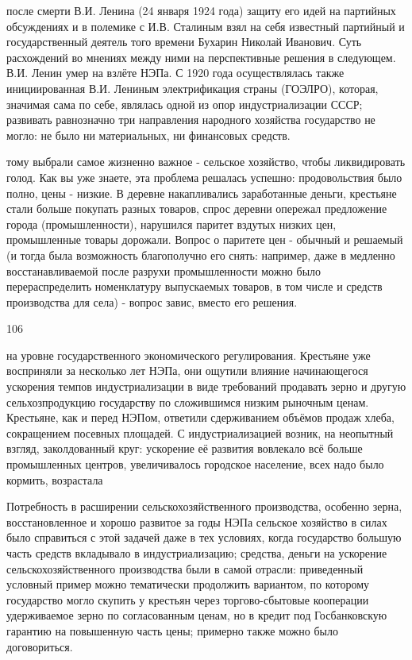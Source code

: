 \label{104-1}
после смерти
В.И. Ленина (24 января 1924 года) защиту его идей на партийных обсуждениях и в полемике с И.В. Сталиным взял на себя известный партийный и государственный деятель того времени Бухарин Николай Иванович. Суть расхождений во мнениях между ними на перспективные решения в следующем. В.И. Ленин умер на взлёте НЭПа. С 1920 года осуществлялась также инициированная В.И. Лениным электрификация страны (ГОЭЛРО), которая, значимая сама по себе, являлась одной из опор индустриализации СССР; развивать равнозначно три направления народного хозяйства государство не могло: не было ни материальных, ни финансовых средств.

\label{105-1}
тому выбрали самое жизненно важное - сельское хозяйство, чтобы ликвидировать голод. Как вы уже знаете, эта проблема решалась успешно: продовольствия было полно, цены - низкие. В деревне накапливались заработанные деньги, крестьяне стали больше покупать разных товаров, спрос деревни опережал предложение города (промышленности), нарушился паритет вздутых низких цен, промышленные товары дорожали. Вопрос о паритете цен - обычный и решаемый (и тогда была возможность благополучно его снять: например, даже в медленно восстанавливаемой после разрухи промышленности можно было перераспределить номенклатуру выпускаемых товаров, в том числе и средств производства для села) - вопрос завис, вместо его решения.

\label{106-1}
106

на уровне государственного экономического регулирования. Крестьяне уже восприняли за несколько лет НЭПа, они ощутили влияние начинающегося ускорения темпов индустриализации в виде требований продавать зерно и другую сельхозпродукцию государству по сложившимся низким рыночным ценам. Крестьяне, как и перед НЭПом, ответили сдерживанием объёмов продаж хлеба, сокращением посевных площадей. С индустриализацией возник, на неопытный взгляд, заколдованный круг: ускорение её развития вовлекало всё больше промышленных центров, увеличивалось городское население, всех надо было кормить, возрастала

\label{107-1}
Потребность в расширении сельскохозяйственного производства, особенно зерна, восстановленное и хорошо развитое за годы НЭПа сельское хозяйство в силах было справиться с этой задачей даже в тех условиях, когда государство большую часть средств вкладывало в индустриализацию; средства, деньги на ускорение сельскохозяйственного производства были в самой отрасли: приведенный условный пример можно тематически продолжить вариантом, по которому государство могло скупить у крестьян через торгово-сбытовые кооперации удерживаемое зерно по согласованным ценам, но в кредит под Госбанковскую гарантию на повышенную часть цены; примерно также можно было договориться.

